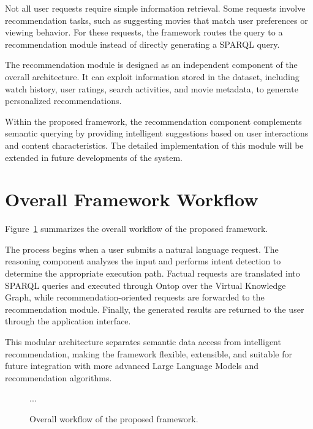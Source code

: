 Not all user requests require simple information retrieval. Some requests involve recommendation tasks, such as suggesting movies that match user preferences or viewing behavior. For these requests, the framework routes the query to a recommendation module instead of directly generating a SPARQL query.

The recommendation module is designed as an independent component of the overall architecture. It can exploit information stored in the dataset, including watch history, user ratings, search activities, and movie metadata, to generate personalized recommendations.

Within the proposed framework, the recommendation component complements semantic querying by providing intelligent suggestions based on user interactions and content characteristics. The detailed implementation of this module will be extended in future developments of the system.
\section{Overall Framework Workflow}

Figure~\ref{fig:framework_workflow} summarizes the overall workflow of the proposed framework.

The process begins when a user submits a natural language request. The reasoning component analyzes the input and performs intent detection to determine the appropriate execution path. Factual requests are translated into SPARQL queries and executed through Ontop over the Virtual Knowledge Graph, while recommendation-oriented requests are forwarded to the recommendation module. Finally, the generated results are returned to the user through the application interface.

This modular architecture separates semantic data access from intelligent recommendation, making the framework flexible, extensible, and suitable for future integration with more advanced Large Language Models and recommendation algorithms.
\begin{figure}[H]
...
\caption{Overall workflow of the proposed framework.}
\label{fig:framework_workflow}
\end{figure}